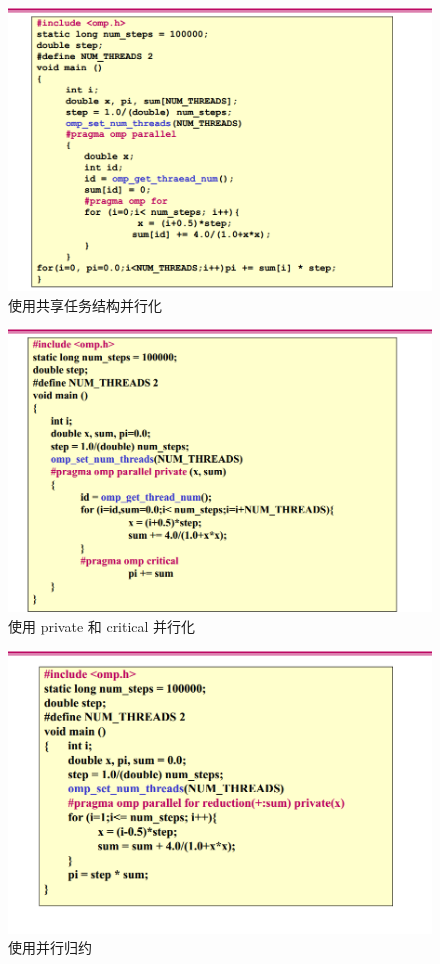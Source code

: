 \documentclass[UTF8,a4paper]{ctexart}
\begin{document}
\begin{figure}[H]
  \centering
  \includegraphics[scale = 0.3]{assets/ParallelComputing_b90f2.png}
  \caption{使用共享任务结构并行化}
\end{figure}

\begin{figure}[H]
  \centering
  \includegraphics[scale = 0.3]{assets/ParallelComputing_c1ef1.png}
  \caption{使用 private 和 critical 并行化}
\end{figure}

\begin{figure}[H]
  \centering
  \includegraphics[scale = 0.3]{assets/ParallelComputing_57888.png}
  \caption{使用并行归约}
\end{figure}
\end{document}
